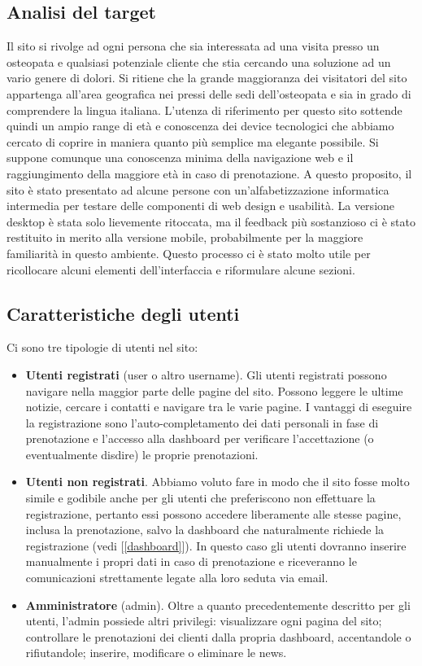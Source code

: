 \documentclass{article}
\begin{document}
\subsection{Analisi del target} \label{target}
Il sito si rivolge ad ogni persona che sia interessata ad una visita presso un osteopata e qualsiasi potenziale cliente che stia cercando una soluzione ad un vario genere di dolori. Si ritiene che la grande maggioranza dei visitatori del sito appartenga all'area geografica nei pressi delle sedi dell'osteopata e sia in grado di comprendere la lingua italiana. L'utenza di riferimento per questo sito sottende quindi un ampio range di età e conoscenza dei device tecnologici che abbiamo cercato di coprire in maniera quanto più semplice ma elegante possibile. Si suppone comunque una conoscenza minima della navigazione web e il raggiungimento della maggiore età in caso di prenotazione.
\newline A questo proposito, il sito è stato presentato ad alcune persone con un'alfabetizzazione informatica intermedia per testare delle componenti di web design e usabilità. La versione desktop è stata solo lievemente ritoccata, ma il feedback più sostanzioso ci è stato restituito in merito alla versione mobile, probabilmente per la maggiore familiarità in questo ambiente. Questo processo ci è stato molto utile per ricollocare alcuni elementi dell'interfaccia e riformulare alcune sezioni.
\subsection{Caratteristiche degli utenti}
Ci sono tre tipologie di utenti nel sito:
\begin{itemize}
    \item \textbf{Utenti registrati} (user o altro username). Gli utenti registrati possono navigare nella maggior parte delle pagine del sito. Possono leggere le ultime notizie, cercare i contatti e navigare tra le varie pagine. I vantaggi di eseguire la registrazione sono l'auto-completamento dei dati personali in fase di prenotazione e l'accesso alla dashboard per verificare l'accettazione (o eventualmente disdire) le proprie prenotazioni.
    \item \textbf{Utenti non registrati}. Abbiamo voluto fare in modo che il sito fosse molto simile e godibile anche per gli utenti che preferiscono non effettuare la registrazione, pertanto essi possono accedere liberamente alle stesse pagine, inclusa la prenotazione, salvo la dashboard che naturalmente richiede la registrazione (vedi [\ref{dashboard}]). In questo caso gli utenti dovranno inserire manualmente i propri dati in caso di prenotazione e riceveranno le comunicazioni strettamente legate alla loro seduta via email.
    \item \textbf{Amministratore} (admin). Oltre a quanto precedentemente descritto per gli utenti, l'admin possiede altri privilegi: visualizzare ogni pagina del sito; controllare le prenotazioni dei clienti dalla propria dashboard, accentandole o rifiutandole; inserire, modificare o eliminare le news.
\end{itemize}
\end{document}
